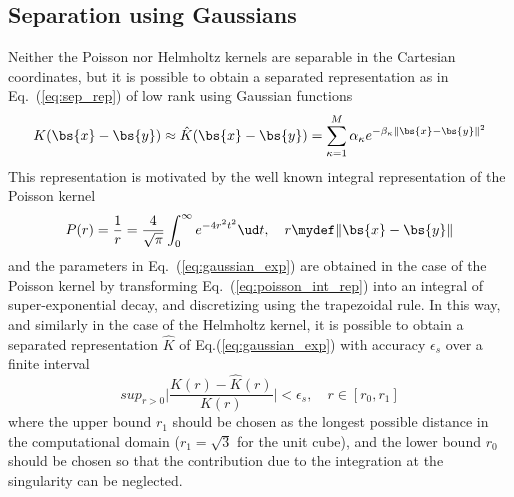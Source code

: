 \subsection{Separation using Gaussians}
Neither the Poisson nor Helmholtz kernels are separable in the Cartesian coordinates, 
but it is possible to obtain a separated representation as in Eq.~(\ref{eq:sep_rep}) 
of low rank using Gaussian functions
\begin{equation}
    \label{eq:gaussian_exp}
    K(\bs{x}-\bs{y}) \approx \hat{K}(\bs{x}-\bs{y}) = 
	\sum_{\kappa=1}^M \alpha_\kappa e^{-\beta_\kappa \|\bs{x}-\bs{y}\|^2}
\end{equation}
This representation is motivated by the well known integral representation of the 
Poisson kernel\cite{something}
\begin{equation}
    \label{eq:poisson_int_rep}
    P(r) = \frac{1}{r} = \frac{4}{\sqrt{\pi}}\int_0^\infty e^{-4r^2t^2}\ud t, 
	\quad r \mydef \|\bs{x}-\bs{y}\|
\end{equation}
and the parameters in Eq.~(\ref{eq:gaussian_exp}) are obtained in the case of the Poisson 
kernel by transforming Eq.~(\ref{eq:poisson_int_rep}) into an integral of super-exponential 
decay, and discretizing using the trapezoidal rule\cite{Harrison,Frediani}. In this way, 
and similarly in the case of the Helmholtz kernel, it is possible to obtain a separated 
representation $\hat{K}$ of Eq.(\ref{eq:gaussian_exp}) with accuracy $\epsilon_s$ over a 
finite interval
\begin{equation}
    sup_{r>0}\Big|\frac{K(r)-\hat{K}(r)}{K(r)}\Big| < \epsilon_s, \quad r\in[r_0,r_1]
\end{equation}
where the upper bound $r_1$ should be chosen as the longest possible distance
in the computational domain ($r_1=\sqrt{3}$ for the unit cube), and the lower
bound $r_0$ should be chosen so that the contribution due to the integration
at the singularity can be neglected\cite{Frediani}.

